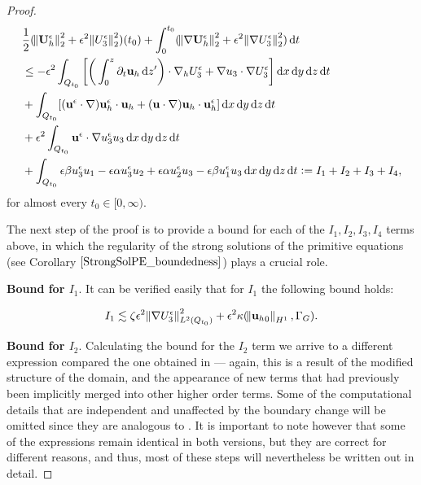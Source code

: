 \documentclass[11pt]{article}
\newcommand*\diff{\mathop{}\!\mathrm{d}}
\begin{document}
\begin{proof}
\begin{equation} \label{introduce_I_terms}
\begin{split}
& \frac{1}{2} (\norm{\mathbf{U}_h^\epsilon}_2^2 + \epsilon^2 \norm{U_3^\epsilon}_2^2) (t_0) + \int_0^{t_0} (\norm{\nabla \mathbf{U}_h^\epsilon}_2^2 + \epsilon^2 \norm{\nabla U_3^\epsilon}_2^2) \diff t \\
& \leq - \epsilon^2 \int_{Q_{t_0}} \bigg [ \bigg ( \int_0^z \partial_t \mathbf{u}_h \diff z' \bigg ) \cdot \nabla_h U_3^\epsilon + \nabla u_3 \cdot \nabla U_3^\epsilon \bigg ] \diff x \diff y \diff z \diff t \\
& + \int_{Q_{t_0}} [(\mathbf{u}^\epsilon \cdot \nabla) \mathbf{u}_h^\epsilon \cdot \mathbf{u}_h + (\mathbf{u} \cdot \nabla )\mathbf{u}_h \cdot \mathbf{u}_h^\epsilon] \diff x \diff y \diff z \diff t \\
& + \epsilon^2 \int_{Q_{t_0}} \mathbf{u}^\epsilon \cdot \nabla u_3^\epsilon u_3 \diff x \diff y \diff z \diff t \\
& + \int_{Q_{t_0}} \epsilon \beta u_3^\epsilon u_1 - \epsilon \alpha u_3^\epsilon u_2 + \epsilon \alpha u_2^\epsilon u_3 - \epsilon \beta u_1^\epsilon u_3 \diff x \diff y \diff z \diff t := I_1 + I_2 + I_3 + I_4, \raisetag{80pt}
\end{split}
\end{equation}
%
for almost every $t_0 \in [0, \infty).$

The next step of the proof is to provide a bound for each of the $I_1, I_2, I_3, I_4$ terms above, in which the regularity of the strong solutions of the primitive equations (see Corollary $\ref{StrongSolPE_boundedness}$) plays a crucial role.

\textbf{Bound for $I_1.$} It can be verified easily that for $I_1$ the following bound holds:

$$ I_1 \lesssim \zeta \epsilon^2 \norm{\nabla U_3^\epsilon}^2_{L^2(Q_{t_0})} + \epsilon^2 \kappa (\norm{{\mathbf{u}_h}_0}_{H^1}, \Gamma_G). $$

\textbf{Bound for $I_2.$} Calculating the bound for the $I_2$ term we arrive to a different expression compared the one obtained in \cite{li2019primitive} --- again, this is a result of the modified structure of the domain, and the appearance of new terms that had previously been implicitly merged into other higher order terms. Some of the computational details that are independent and unaffected by the boundary change will be omitted since they are analogous to \cite{li2019primitive}. It is important to note however that some of the expressions remain identical in both versions, but they are correct for different reasons, and thus, most of these steps will nevertheless be written out in detail.


\end{proof}
\end{document}
